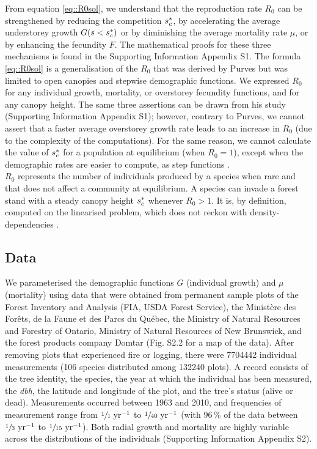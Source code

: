 From equation \eqref{eq::R0sol}, we understand that the reproduction rate $ R_0 $ can be strengthened by reducing the competition $ {s}^{*}_c $, by accelerating the average understorey growth $ G(s < {s}^{*}_c) $ or by diminishing the average mortality rate $ \mu $, or by enhancing the fecundity $ F $. The mathematical proofs for these three mechanisms is found in the Supporting Information Appendix S1. The formula \eqref{eq::R0sol} is a generalisation of the $ R_0 $ that was derived by Purves but was limited to open canopies and stepwise demographic functions. We expressed $ R_0 $ for any individual growth, mortality, or overstorey fecundity functions, and for any canopy height. The same three assertions can be drawn from his study (Supporting Information Appendix S1); however, contrary to Purves, we cannot assert that a faster average overstorey growth rate leads to an increase in $ R_0 $ (due to the complexity of the computations). For the same reason, we cannot calculate the value of $ {s}^{*}_c $ for a population at equilibrium (\ie when $ R_0 = 1 $), except when the demographic rates are easier to compute, as step functions \citep[Supporting Information Appendix S1 for the proof]{Purves2009}. \\

$ R_0 $ represents the number of individuals produced by a species when rare and that does not affect a community at equilibrium. A species can invade a forest stand with a steady canopy height $ {s}^{*}_c $ whenever $ R_0 > 1 $. It is, by definition, computed on the linearised problem, which does not reckon with density-dependencies \citep{Diekmann1990}.

\subsection{Data}
We parameterised the demographic functions $ G $ (individual growth) and $ \mu $ (mortality) using data that were obtained from permanent sample plots of the Forest Inventory and Analysis (FIA, USDA Forest Service), the Ministère des Forêts, de la Faune et des Parcs du Québec, the Ministry of Natural Resources and Forestry of Ontario, Ministry of Natural Resources of New Brunswick, and the forest products company Domtar (Fig. S2.2 for a map of the data). After removing plots that experienced fire or logging, there were \num{7704442} individual measurements (106 species distributed among \num{132240} plots). A record consists of the tree identity, the species, the year at which the individual has been measured, the \textit{\textit{dbh}}, the latitude and longitude of the plot, and the tree's status (alive or dead). Measurements occurred between 1963 and 2010, and frequencies of measurement range from $ \sfrac{1}{1} \text{ yr}^{-1} $ to $ \sfrac{1}{40} \text{ yr}^{-1} $ (with $ 96 \, \% $ of the data between $ \sfrac{1}{3} \text{ yr}^{-1} $ to $ \sfrac{1}{15} \text{ yr}^{-1} $). Both radial growth and mortality are highly variable across the distributions of the individuals (Supporting Information Appendix S2).

